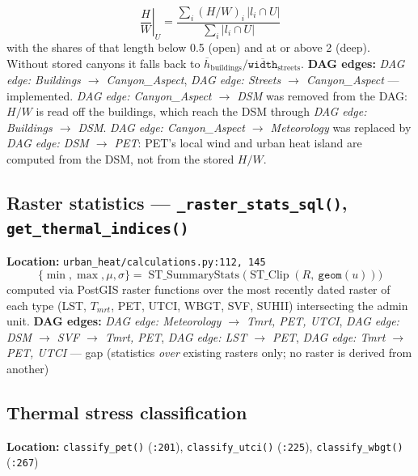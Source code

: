 \documentclass[11pt]{article}
\newcommand{\code}[1]{\texttt{#1}}
\newcommand{\dagedge}[1]{\textit{DAG edge: #1}}
\newcommand{\statusdone}{\textcolor{green!50!black}{implemented}}
\newcommand{\statusgap}{\textcolor{red!70!black}{gap}}
\begin{document}
\begin{equation}
  \left.\frac{H}{W}\right|_U = \frac{\sum_i (H/W)_i\, |l_i \cap U|}{\sum_i |l_i \cap U|}
\end{equation}
with the shares of that length below 0.5 (open) and at or above 2 (deep). Without stored canyons it falls back to $\overline{h}_{\text{buildings}} / \overline{\code{width}}_{\text{streets}}$.
\textbf{DAG edges:} \dagedge{Buildings $\rightarrow$ Canyon\_Aspect}, \dagedge{Streets $\rightarrow$ Canyon\_Aspect} --- \statusdone{}. \dagedge{Canyon\_Aspect $\rightarrow$ DSM} was removed from the DAG: $H/W$ is read off the buildings, which reach the DSM through \dagedge{Buildings $\rightarrow$ DSM}. \dagedge{Canyon\_Aspect $\rightarrow$ Meteorology} was replaced by \dagedge{DSM $\rightarrow$ PET}: PET's local wind and urban heat island are computed from the DSM, not from the stored $H/W$.

\subsection{Raster statistics --- \code{\_raster\_stats\_sql()}, \code{get\_thermal\_indices()}}
\textbf{Location:} \code{urban\_heat/calculations.py:112, 145}
\begin{equation}
  \{\min, \max, \mu, \sigma\} = \operatorname{ST\_SummaryStats}\big(\operatorname{ST\_Clip}(R,\ \texttt{geom}(u))\big)
\end{equation}
computed via PostGIS raster functions over the most recently dated raster of each type (LST, $T_{mrt}$, PET, UTCI, WBGT, SVF, SUHII) intersecting the admin unit. \textbf{DAG edges:} \dagedge{Meteorology $\rightarrow$ Tmrt, PET, UTCI}, \dagedge{DSM $\rightarrow$ SVF $\rightarrow$ Tmrt, PET}, \dagedge{LST $\rightarrow$ PET}, \dagedge{Tmrt $\rightarrow$ PET, UTCI} --- \statusgap{} (statistics \emph{over} existing rasters only; no raster is derived from another)

\subsection{Thermal stress classification}
\textbf{Location:} \code{classify\_pet()} (\code{:201}), \code{classify\_utci()} (\code{:225}), \code{classify\_wbgt()} (\code{:267})
\end{document}
